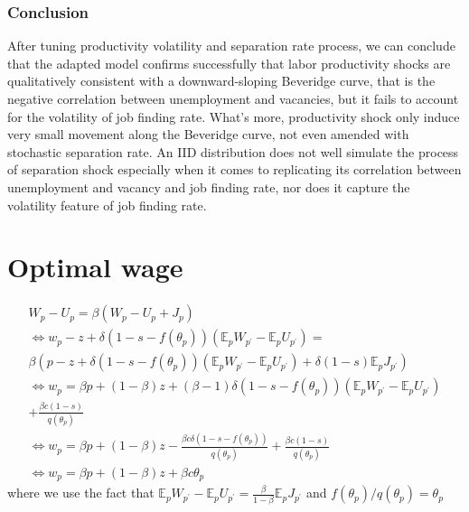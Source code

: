 \documentclass[10pt]{article} %
\begin{document}
    \subsubsection{Conclusion}
    After tuning productivity volatility and separation rate process, we can conclude that the adapted \cite{Shimer2005} model confirms successfully that labor productivity shocks are qualitatively consistent with a downward-sloping Beveridge curve, that is the negative correlation between unemployment and vacancies, but it fails to account for the volatility of job finding rate. What's more, productivity shock only induce very small movement along the Beveridge curve, not even amended with stochastic separation rate. An IID distribution does not well simulate the process of separation shock especially when it comes to replicating its correlation between unemployment and vacancy and job finding rate, nor does it capture the volatility feature of job finding rate.

\newpage
\footnotesize



\appendix
\section{Optimal wage}\label{OptWage}
\begin{gather*}
    W_p - U_p = \beta (W_p - U_p + J_p)\\
    \Leftrightarrow
    w_p - z + \delta (1-s-f(\theta_p))(\mathbb{E}_p W_{p^\prime}-\mathbb{E}_p U_{p^\prime}) =\\
    \beta (p-z+\delta (1-s-f(\theta_p))(\mathbb{E}_p W_{p^\prime}-\mathbb{E}_p U_{p^\prime}) +\delta(1-s)\mathbb{E}_p J_{p^\prime})\\
    \Leftrightarrow
    w_p = \beta p + (1-\beta)z + (\beta-1)\delta(1-s-f(\theta_p))(\mathbb{E}_p W_{p^\prime}-\mathbb{E}_p U_{p^\prime})\\
     + \frac{\beta c(1-s)}{q(\theta_p)}\\
    \Leftrightarrow
    w_p = \beta p + (1-\beta)z - \frac{\beta c\delta(1-s-f(\theta_p))}{q(\theta_p)} + \frac{\beta c(1-s)}{q(\theta_p)}\\
    \Leftrightarrow
    w_p = \beta p + (1-\beta)z + \beta c \theta_p
\end{gather*}
where we use the fact that \(\mathbb{E}_p W_{p^\prime}-\mathbb{E}_p U_{p^\prime} = \frac{\beta}{1-\beta}\mathbb{E}_p J_{p^\prime}\) and \(f(\theta_p)/q(\theta_p)=\theta_p\)
\end{document}
